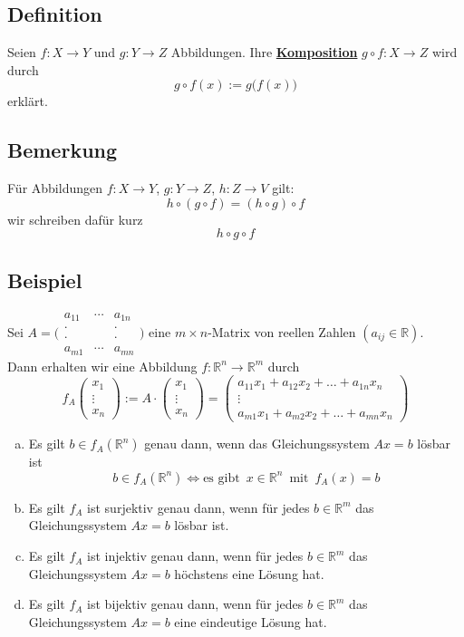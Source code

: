 \subsection{Definition}
Seien \(f : X \rightarrow Y\) und \(g: Y \rightarrow Z\) Abbildungen. Ihre \underline{\textbf{Komposition}} \( g \circ f : X \rightarrow Z\) wird durch 
\[
g \circ f (x) := g\big(f(x)\big)
\]
erklärt.

\subsection{Bemerkung}
Für Abbildungen \( f : X \rightarrow Y\), \( g : Y \rightarrow Z\), \( h : Z \rightarrow V\) gilt:
\[
h \circ (g \circ f)=(h \circ g) \circ f
\]
wir schreiben dafür kurz
\[
h \circ g \circ f
\]

\subsection{Beispiel}
Sei \(A = \bigg(\begin{smallmatrix} a_{11} & \cdots & a_{1n} \\ \cdot & & \cdot \\ \cdot & & \cdot \\ a_{m1} & \cdots & a_{mn}\end{smallmatrix}\bigg) \) eine \(m \times n\)-Matrix von reellen Zahlen \( (a_{ij} \in \mathds{R}) \). \\
Dann erhalten wir eine Abbildung \(f: \mathds{R}^n \rightarrow \mathds{R}^m\) durch 
\[
f_A \begin{pmatrix} x_1 \\ \vdots \\ x_n \end{pmatrix} := A\cdot \begin{pmatrix} x_1 \\ \vdots \\ x_n \end{pmatrix} =
\begin{pmatrix}
a_{11}x_1 + a_{12}x_2 + \ldots + a_{1n}x_n \\
\vdots \\
a_{m1}x_1 + a_{m2}x_2 + \ldots + a_{mn}x_n
\end{pmatrix}
\]
\begin{enumerate}[a)]
\item Es gilt \(b \in f_A(\mathds{R}^n) \) genau dann, wenn das Gleichungssystem \(Ax=b\) lösbar ist
\[
b \in f_A(\mathds{R}^n) \Longleftrightarrow \text{es gibt} \enspace x \in \mathds{R}^n \enspace \text{mit} \enspace f_A(x)=b
\]

\item Es gilt \(f_A\) ist surjektiv genau dann, wenn für jedes \(b \in \mathds{R}^m\) das Gleichungssystem \(Ax=b\) lösbar ist.
\item Es gilt \(f_A\) ist injektiv genau dann, wenn für jedes \(b \in \mathds{R}^m\) das Gleichungssystem \(Ax=b\)  höchstens eine Lösung hat.
\item Es gilt \(f_A\) ist bijektiv genau dann, wenn für jedes \(b \in \mathds{R}^m\) das Gleichungssystem \(Ax=b\) eine eindeutige Lösung hat.
\end{enumerate}

